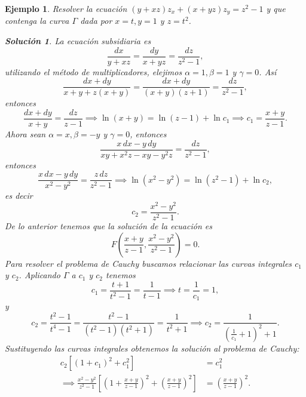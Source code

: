 \documentclass[11pt,letterpaper,draft]{report}
\newtheorem{example}[defn]{Ejemplo}
\newtheorem*{sol}{Solución}
\newcommand\<{\langle}
\renewcommand\>{\rangle}
\begin{document}
\begin{example}
  Resolver la ecuación $(y+xz) z_x + (x+yz) z_y = z^2 - 1$ y
  que contenga la curva $\Gamma$ dada por $x = t, y = 1$ y
  $z = t^2$.
  \begin{sol}
    La ecuación subsidiaria es
    \[
    \frac{dx}{y+xz} = \frac{dy}{x+yz} = \frac{dz}{z^2-1},
    \] 
    utilizando el método de multiplicadores, elejimos
    $\alpha = 1, \beta = 1$ y $\gamma = 0$. Así
    \[
      \frac{dx+dy}{x+y+z(x+y)} = \frac{dx+dy}{(x+y)(z+1)} =
      \frac{dz}{z^2-1},
    \] 
    entonces
    \[
    \frac{dx+dy}{x+y} = \frac{dz}{z-1} \implies \ln(x+y) =
    \ln(z-1) + \ln c_1 \implies c_1 = \frac{x+y}{z-1}.
    \] 
    Ahora sean $\alpha = x, \beta = -y$ y $\gamma = 0$,
    entonces
    \[
    \frac{x \, dx - y \, dy}{xy + x^2z - xy - y^2z} =
    \frac{dz}{z^2-1},
    \] 
    entonces
    \[
    \frac{x \, dx - y \, dy}{x^2-y^2} = \frac{z \,
    dz}{z^2-1} \implies \ln(x^2-y^2) = \ln(z^2-1) + \ln c_2,
    \] 
    es decir
    \[
    c_2 = \frac{x^2-y^2}{z^2-1}.
    \] 
    De lo anterior tenemos que la solución de la ecuación es
    \[
    F\left(\frac{x+y}{z-1}, \frac{x^2-y^2}{z^2-1}\right) =
    0.
    \]
    Para resolver el problema de Cauchy buscamos relacionar
    las curvas integrales $c_1$ y $c_2$. Aplicando $\Gamma$ 
    a $c_1$ y $c_2$ tenemos
    \[
    c_1 = \frac{t+1}{t^2-1} = \frac{1}{t-1} \implies t =
    \frac{1}{c_1} = 1,
    \] 
    y
    \[
    c_2 = \frac{t^2-1}{t^4 - 1} =
    \frac{t^2-1}{(t^2-1)(t^2+1)} = \frac{1}{t^2+1} \implies
    c_2 = \frac{1}{\left(\frac{1}{c_1}+1\right)^2+1}.
    \] 
    Sustituyendo las curvas integrales obtenemos la solución
    al problema de Cauchy:
    \begin{align*}
      c_2 \left[(1+c_1)^2 + c_1^2\right] &= c_1^2\\
      \implies
      \frac{x^2-y^2}{z^2-1}\left[\left(1+\frac{x+y}{z-1}\right)^2
    + \left(\frac{x+y}{z-1}\right)^2 \right] &=
        \left(\frac{x+y}{z-1}\right)^2.
    \end{align*}
  \end{sol}
\end{example}
\end{document}
